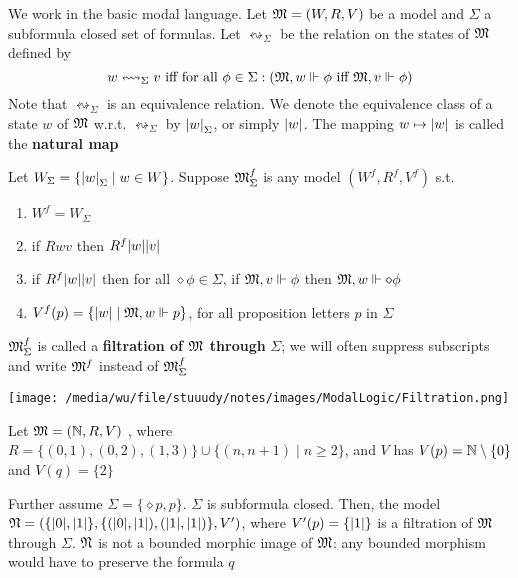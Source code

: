 \documentclass[11pt]{article}
\begin{document}
\begin{definition}[Filtrations]
We work in the basic modal language. Let \(\mathfrak{M}=(W,R,V)\) be a model and \(\Sigma\) a
subformula closed set of formulas. Let \(\leftrightsquigarrow_\Sigma\) be
the relation on the states of \(\mathfrak{M}\) defined by
\begin{equation*}
w\leftrightsquigarrow_\Sigma v \text{ iff for all }\phi\in\Sigma:
(\mathfrak{M},w\Vdash\phi\text{ iff }\mathfrak{M},v\Vdash\phi)
\end{equation*}
Note that \(\leftrightsquigarrow_\Sigma\) is an equivalence relation. We
denote the equivalence class of a state \(w\) of \(\mathfrak{M}\) w.r.t.
\(\leftrightsquigarrow_\Sigma\) by \(\abs{w}_\Sigma\), or simply
\(\abs{w}\). The mapping \(w\mapsto\abs{w}\) is called the \textbf{natural map}

Let \(W_\Sigma=\{\abs{w}_\Sigma\mid w\in W\}\). Suppose \(\mathfrak{M}_\Sigma^f\) is
any model \((W^f,R^f,V^f)\) s.t.
\begin{enumerate}
\item \(W^f=W_\Sigma\)
\item if \(Rwv\) then \(R^f\abs{w}\abs{v}\)
\item if \(R^f\abs{w}\abs{v}\) then for all \(\diamond\phi\in\Sigma\), if
\(\mathfrak{M},v\Vdash\phi\) then \(\mathfrak{M},w\Vdash\diamond\phi\)
\item \(V^f(p)=\{\abs{w}\mid\fM,w\Vdash p\}\), for all proposition letters
\(p\) in \(\Sigma\)
\end{enumerate}


\(\mathfrak{M}_\Sigma^f\) is called a \textbf{filtration of \(\mathfrak{M}\) through} \(\Sigma\); we will
often suppress subscripts and write \(\mathfrak{M}^f\) instead of \(\mathfrak{M}_\Sigma^f\)
\end{definition}
\label{def2.36}
\begin{center}
\texttt{[image: /media/wu/file/stuuudy/notes/images/ModalLogic/Filtration.png]}
\end{center}

Let \(\mathfrak{M}=(\mathbb{N},R,V)\) , where \(R=\{(0,1),(0,2),(1,3)\}\cup\{(n,n+1)\mid
    n\ge2\}\), and \(V\) has \(V(p)=\mathbb{N}\setminus\{0\}\) and \(V(q)=\{2\}\)

Further assume \(\Sigma=\{\diamond p,p\}\). \(\Sigma\) is subformula closed. Then,
the model
\(\fN=(\{\abs{0},\abs{1}\},\{(\abs{0},\abs{1}),(\abs{1},\abs{1})\},V')\),
where \(V'(p)=\{\abs{1}\}\) is a filtration of \(\mathfrak{M}\) through \(\Sigma\). \(\mathfrak{N}\) is
not a bounded morphic image of \(\mathfrak{M}\): any bounded morphism would have to
preserve the formula \(q\)
\end{document}
